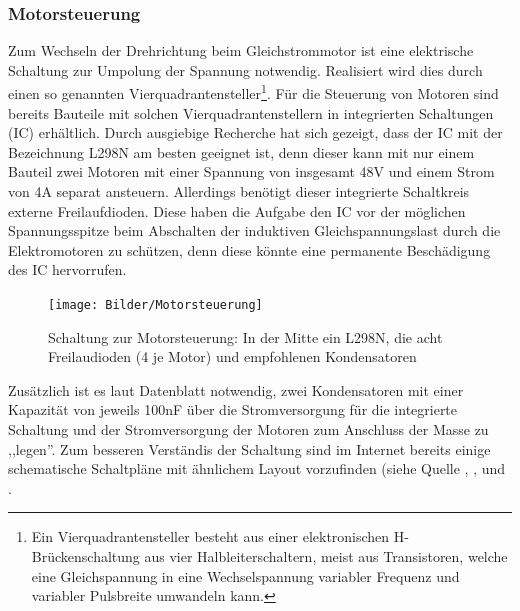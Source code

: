 \documentclass[a4paper, 12pt, bibtotocnumbered, liststotocnumbered]{scrartcl}
\begin{document}
	\subsubsection{Motorsteuerung}
	Zum Wechseln der Drehrichtung beim Gleichstrommotor ist eine elektrische Schaltung zur Umpolung der Spannung notwendig. Realisiert wird dies durch einen so genannten Vierquadrantensteller\footnote{Ein Vierquadrantensteller besteht aus einer elektronischen H-Brückenschaltung aus vier Halbleiterschaltern, meist aus Transistoren, welche eine Gleichspannung in eine Wechselspannung variabler Frequenz und variabler Pulsbreite umwandeln kann.}\cite{wikipedia-inkrementalgeber}. Für die Steuerung von Motoren sind bereits Bauteile mit solchen Vierquadrantenstellern in integrierten Schaltungen (IC) erhältlich. Durch ausgiebige Recherche hat sich gezeigt, dass der IC mit der Bezeichnung L298N am besten geeignet ist, denn dieser kann mit nur einem Bauteil zwei Motoren mit einer Spannung von insgesamt 48V und einem Strom von 4A separat ansteuern. Allerdings benötigt dieser integrierte Schaltkreis externe Freilaufdioden. Diese haben die Aufgabe den IC vor der möglichen Spannungsspitze beim Abschalten der induktiven Gleichspannungslast durch die Elektromotoren zu schützen, denn diese könnte eine permanente Beschädigung des IC hervorrufen\cite{wikipedia-schutzdiode}.

	\begin{figure}[htb]
		\centering
		\texttt{[image: Bilder/Motorsteuerung]}
		\caption{Schaltung zur Motorsteuerung: In der Mitte ein L298N, die acht Freilaudioden (4 je Motor) und empfohlenen Kondensatoren}
	\end{figure}

	Zusätzlich ist es laut Datenblatt\cite{l298} notwendig, zwei Kondensatoren mit einer Kapazität von jeweils 100nF über die Stromversorgung für die integrierte Schaltung und der Stromversorgung der Motoren zum Anschluss der Masse zu ,,legen''.
	Zum besseren Verständis der Schaltung sind im Internet bereits einige schematische Schaltpläne mit ähnlichem Layout vorzufinden (siehe Quelle \cite{arduino-motor}, \cite{rn-steuerung}, \cite{motordriver} und \cite{l289-schaltung}.
\end{document}
